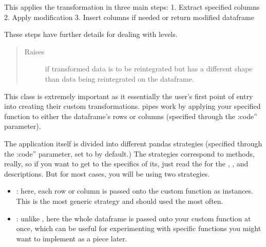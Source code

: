 \documentclass[letterpaper,10pt,english]{sphinxmanual}
\begin{document}
\begin{fulllineitems}
\begin{fulllineitems}
This applies the transformation in three main steps:
1. Extract specified columns
2. Apply modification
3. Insert columns if needed or return modified dataframe

These steps have further details for dealing with levels.
\begin{quote}\begin{description}
\item[{Raises}] \leavevmode
{} \textendash{} if transformed data is to be reintegrated but has a
    different shape than data being reintegrated on the dataframe.

\end{description}\end{quote}

\end{fulllineitems}


\end{fulllineitems}


This class is extremely important as it essentially the user’s first point of entry into creating their custom transformations.  pipes work by applying your specified function to either the dataframe’s rows or columns (specified through the :code” parameter).

The application itself is divided into different pandas strategies (specified through the :code” parameter, set to  by default.) The strategies correspond to  methods, really, so if you want to get to the specifics of its, just read the  for the , ,  and  descriptions. But for most cases, you will be using two strategies.
\begin{itemize}
\item {} 
: here, each row or column is passed onto the custom function as  instances. This is the most generic strategy and should used the most often.

\item {} 
: unlike , here the whole dataframe is passed onto your custom function at once, which can be useful for experimenting with specific functions you might want to implement as a piece later.

\end{itemize}
\end{document}
